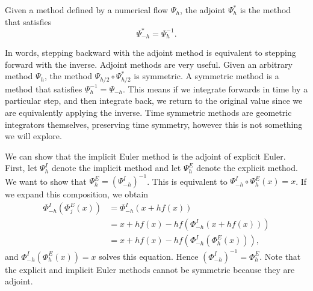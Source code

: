 \begin{definition}
	Given a method defined by a numerical flow $\Psi_h$,
	the adjoint $\Psi^*_h$ is the method that satisfies
	\begin{equation*}
		\Psi^*_{-h} = \Psi^{-1}_h.
	\end{equation*}
\end{definition}

In words, stepping backward with the adjoint method is equivalent to stepping forward with the inverse.
Adjoint methods are very useful. Given an arbitrary method $\Psi_h$,
the method $\Psi_{h/2} \circ \Psi_{h/2}^*$ is symmetric.
A symmetric method is a method that satisfies $\Psi_h^{-1} = \Psi_{-h}$.
This means if we integrate forwards in time by a particular step, and then integrate back,
we return to the original value since we are equivalently applying the inverse.
Time symmetric methods are geometric integrators themselves, preserving time symmetry,
however this is not something we will explore. %

We can show that the implicit Euler method is the adjoint of explicit Euler.
First, let $\Psi_h^I$ denote the implicit method and let $\Psi_h^E$ denote the explicit method.
We want to show that $\Psi_h^E = (\Psi_{-h}^I)^{-1}$.
This is equivalent to $\Psi_{-h}^I \circ \Psi_h^E (x) = x$.
If we expand this composition, we obtain
\begin{align*}
	\Phi_{-h}^I \left( \Phi_j^E  (x) \right) &= \Phi_{-h}^I \left( x + h f(x) \right) \\
	&= x + h f(x) - h f\left( \Phi_{-h}^I \left( x + h f(x) \right) \right) \\
	&= x + h f(x) - h f\left( \Phi_{-h}^I \left( \Phi_h^E (x) \right) \right),
\end{align*}
and $\Phi_{-h}^I (\Phi_h^E (x)) = x$ solves this equation. Hence $(\Phi_{-h}^I)^{-1} = \Phi_h^E$.
Note that the explicit and implicit Euler methods cannot be symmetric because they are adjoint.

